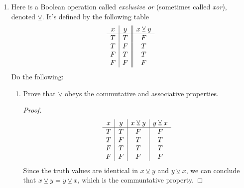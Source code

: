 \documentclass[12pt]{article}
\begin{document}
\begin{enumerate}
	\item
	Here is a Boolean operation called \emph{exclusive or} (sometimes called \emph{xor}), denoted $\veebar$. It's defined by the following table
		\begin{displaymath}
		\begin{array}{c| c||c}
			x & y & x \veebar y \\ %
			\hline  %
			T & T & F\\
			T & F & T\\
			F & T & T\\
			F & F & F\\
		\end{array}	
	\end{displaymath}
	Do the following:
	\begin{enumerate}
		\item Prove that $\veebar$ obeys the commutative and associative properties.
		
		\begin{proof}
				\begin{displaymath}
				\begin{array}{c| c| c|c}
					x & y & x \veebar y & y \veebar x \\ %
					\hline  %
					T & T & F &F\\
					T & F & T &T\\
					F & T & T &T\\
					F & F & F &F\\
				\end{array}	
			\end{displaymath}
			Since the truth values are identical in $x \veebar y$ and $y \veebar x$, we can conclude that  $x \veebar y = y \veebar x$, which is the communtative property.
			

\end{proof}
\end{enumerate}
\end{enumerate}
\end{document}
